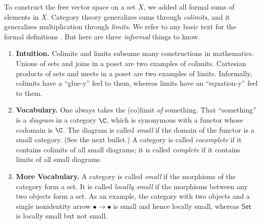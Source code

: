 To construct the free vector space on a set $X$, we added all formal sums of elements in $X$. Category theory generalizes sums through \emph{colimits}, and it generalizes multiplication through \emph{limits}. We refer to any basic text for the formal definitions \cite{riehl2017category}. But here are three \textit{informal} things to know.
  \begin{enumerate}
    \item \textbf{Intuition.} Colimits and limits subsume many constructions in mathematics. Unions of sets and joins in a poset are two examples of colimits. Cartesian products of sets and meets in a poset are two examples of limits. Informally, colimits have a ``glue-y'' feel to them, whereas limits have an ``equation-y'' feel to them.

    \item \textbf{Vocabulary.} One always takes the (co)limit \textit{of} something. That ``something'' is a \emph{diagram} in a category $\C$, which is synonymous with a functor whose codomain is $\C$. The diagram is called \emph{small} if the domain of the functor is a small category. (See the next bullet.) A category is called \emph{cocomplete} if it contains  colimits of all small diagrams; it is called \emph{complete} if it contains limits of all small diagrams.

    \item \textbf{More Vocabulary.} A category is called \emph{small} if the morphisms of the category form a set. It is called \emph{locally small} if the morphisms between any two objects form a set. As an example, the category with two objects and a single nonidentity arrow $\bullet\to\bullet$ is small and hence locally small, whereas $\mathsf{Set}$ is locally small but not small.
  \end{enumerate} 

